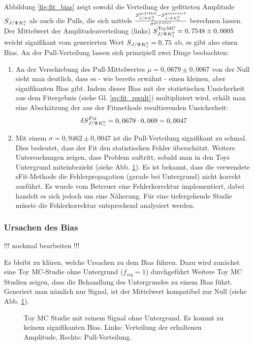 Abbildung \ref{fig:fit_bias} zeigt sowohl die Verteilung der gefitteten Amplitude $S_{J/\Psi K_s^0}$ als auch die Pulls, die sich mittels $\frac{S_{J/\Psi K_s^0}^{gefittet} - S_{J/\Psi K_s^0}^{generiert}}{\sigma^{gefittet}}$ berechnen lassen. Der Mittelwert der Amplitudenverteilung (links) $S_{J/\Psi K_s^0}^{\text{ToyMC}} = 0,7548 \pm 0,0005$ weicht signifikant vom generierten Wert $S_{J/\Psi K_s^0} = 0,75$ ab, es gibt also einen Bias. An der Pull-Verteilung lassen sich prinzipiell zwei Dinge beobachten:
\begin{enumerate}
    \item An der Verschiebung des Pull-Mittelwertes $\mu = 0,0679 \pm 0,0067$ von der Null sieht man deutlich, dass es - wie bereits erwähnt - einen kleinen, aber signifikanten Bias gibt. Indem dieser Bias mit der statistischen Unsicherheit aus dem Fitergebnis (siehe Gl. \ref{eq:fit_result}) multipliziert wird, erhält man eine Abschätzung der aus der Fitmethode resultierenden Unsicherheit:
        \begin{align}
        \delta S_{J/\Psi K_s^0}^{Fit} = 0,0679 \cdot 0,069 = 0,0047
        \end{align}

    \item Mit einem $\sigma = 0,9462 \pm 0,0047$ ist die Pull-Verteilung signifikant zu schmal. Dies bedeutet, dass der Fit den statistischen Fehler überschätzt. Weitere Untersuchungen zeigen, dass Problem auftritt, sobald man in den Toys Untergrund miteinbezieht (siehe Abb. \ref{fig:toys_no_bkg}). Es ist bekannt, dass die verwendete sFit-Methode die Fehlerpropagation (gerade bei Untergrund) nicht korrekt ausführt. Es wurde vom Betreuer eine Fehlerkorrektur implementiert, dabei handelt es sich jedoch um eine Näherung. Für eine tiefergehende Studie müsste die Fehlerkorrektur entsprechend analysiert werden.
\end{enumerate}

\subsubsection{Ursachen des Bias}
!!! nochmal bearbeiten !!!

Es bleibt zu klären, welche Ursachen zu dem Bias führen. Dazu wird zunächst eine Toy MC-Studie ohne Untergrund ($f_{sig}=1$) durchgeführt
Weitere Toy MC Studien zeigen, dass die Behandlung des Untergrundes zu einem Bias führt. Generiert man nämlich nur Signal, ist der Mittelwert kompatibel zur Null (siehe Abb. \ref{fig:toys_no_bkg}).

\begin{figure}[hptb]
\centering
\caption{Toy MC Studie mit reinem Signal ohne Untergrund. Es kommt zu keinem signifikanten Bias. Links: Verteilung der erhaltenen Amplitude, Rechts: Pull-Verteilung.}
\label{fig:toys_no_bkg}
\end{figure}

